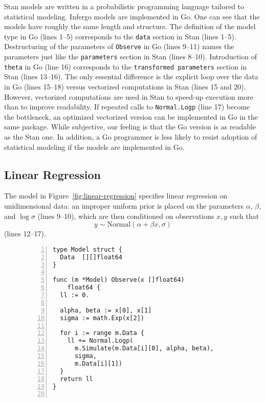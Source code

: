 \documentclass[sigplan,review,10pt,anonymous]{acmart}
\begin{document}
\begin{sloppypar}
Stan models are written in a probabilistic programming language
tailored to statistical modeling. Infergo models are implemented
in Go. One can see that the models have roughly the same length
and structure. The definition of the model type in Go (lines
1--5) corresponds to the \lstinline{data} section in Stan (lines
1--5). Destructuring of the parameters of \lstinline{Observe} in
Go (lines 9--11) names the parameters just like the
\lstinline{parameters} section in Stan (lines 8--10).
Introduction of \lstinline{theta} in Go (line 16) corresponds to
the \lstinline{transformed parameters} section in Stan (lines
13--16). The only essential difference is the explicit loop over
the data in Go (lines 15--18) versus vectorized computations in
Stan (lines 15 and 20). However, vectorized computations are used
in Stan to speed-up execution more than to improve readability.
If repeated calls to \lstinline{Normal.Logp} (line 17) become
the bottleneck, an optimized vectorized version can be
implemented in Go in the same package. While subjective, our
feeling is that the Go version is as readable as the Stan one.
In addition, a Go programmer is less likely to resist adoption
of statistical modeling if the models are implemented in Go.

\subsection{Linear Regression}
\label{sec:linear-regression}

The model in Figure~\ref{fig:linear-regression} specifies linear
regression on unidimensional data: an improper uniform prior is
placed on the parameters $\alpha$, $\beta$, and $\log \sigma$
(lines 9--10), which are then conditioned on observations $x, y$
such that
\begin{equation}
y \sim \mathrm{Normal}(\alpha + \beta x, \sigma)
	\label{eqn:linear-regression-1}
\end{equation}
(lines 12--17).
\begin{figure}
\begin{lstlisting}[framexleftmargin=10pt,numbers=left]
type Model struct {
  Data  [][]float64
}

func (m *Model) Observe(x []float64)
    float64 {
  ll := 0.

  alpha, beta := x[0], x[1]
  sigma := math.Exp(x[2])

  for i := range m.Data {
    ll += Normal.Logp(
      m.Simulate(m.Data[i][0], alpha, beta),
	  sigma,
	  m.Data[i][1])
  }
  return ll
}


\end{lstlisting}
\end{figure}
\end{sloppypar}
\end{document}
